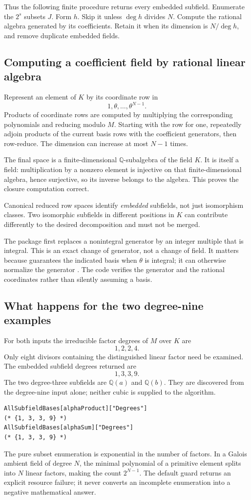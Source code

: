 \documentclass[11pt]{article}
\newcommand{\Q}{\mathbb Q}
\newcommand{\code}[1]{\texttt{\detokenize{#1}}}
\theoremstyle{definition}\newtheorem{definition}[theorem]{Definition}
\theoremstyle{remark}\newtheorem{remark}[theorem]{Remark}
\begin{document}
Thus the following finite procedure returns every embedded subfield. Enumerate
the $2^s$ subsets $J$. Form $h$. Skip it unless $\deg h$ divides $N$. Compute
the rational algebra generated by its coefficients. Retain it when its dimension
is $N/\deg h$, and remove duplicate embedded fields.

\subsection{Computing a coefficient field by rational linear algebra}
Represent an element of $K$ by its coordinate row in
\[
 1,\theta,\ldots,\theta^{N-1}.
\]
Products of coordinate rows are computed by multiplying the corresponding
polynomials and reducing modulo $M$. Starting with the row for one, repeatedly
adjoin products of the current basis rows with the coefficient generators,
then row-reduce. The dimension can increase at most $N-1$ times.

The final space is a finite-dimensional $\Q$-subalgebra of the field $K$.
It is itself a field: multiplication by a nonzero element is injective on
that finite-dimensional algebra, hence surjective, so its inverse belongs to
the algebra. This proves the closure computation correct.

Canonical reduced row spaces identify \emph{embedded} subfields, not just
isomorphism classes. Two isomorphic subfields in different positions in $K$
can contribute differently to the desired decomposition and must not be merged.

The package first replaces a nonintegral generator by an integer multiple
that is integral. This is an exact change of generator, not a change of field.
It matters because \code{ToNumberField[b,theta]} guarantees the indicated
\code{AlgebraicNumber[theta,...]} basis when $\theta$ is integral; it can
otherwise normalize the generator \cite{tonumberfield,algebraicnumber}.
The code verifies the generator and the rational coordinates rather than
silently assuming a basis.

\subsection{What happens for the two degree-nine examples}
For both inputs the irreducible factor degrees of $M$ over $K$ are
\[
 1,2,2,4.
\]
Only eight divisors containing the distinguished linear factor need be
examined. The embedded subfield degrees returned are
\[
 \boxed{1,3,3,9.}
\]
The two degree-three subfields are $\Q(a)$ and $\Q(b)$. They are discovered
from the degree-nine input alone; neither cubic is supplied to the algorithm.
\begin{lstlisting}
AllSubfieldBases[alphaProduct]["Degrees"]
(* {1, 3, 3, 9} *)
AllSubfieldBases[alphaSum]["Degrees"]
(* {1, 3, 3, 9} *)
\end{lstlisting}
The pure subset enumeration is exponential in the number of factors. In a
Galois ambient field of degree $N$, the minimal polynomial of a primitive
element splits into $N$ linear factors, making the count $2^{N-1}$.
The default \code{"MaxDivisors"} guard returns an explicit resource failure;
it never converts an incomplete enumeration into a negative mathematical answer.
\end{document}
